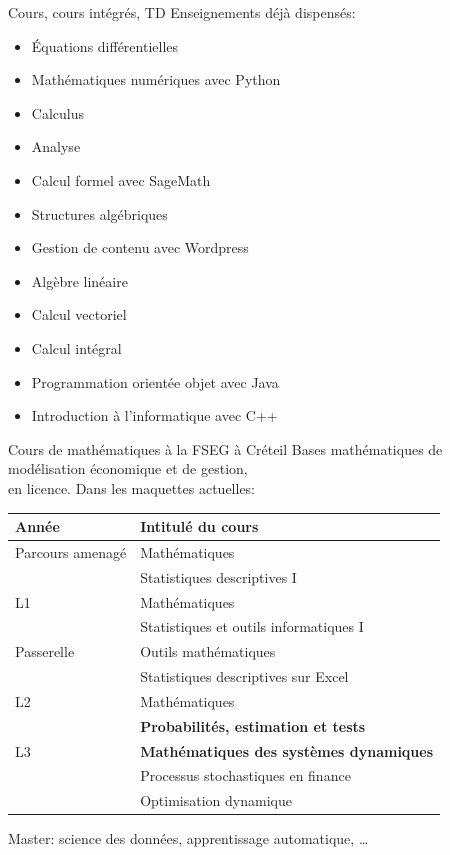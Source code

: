 \documentclass[
  french,
  ignorenonframetext,
]{beamer}
\providecommand{\tightlist}{%
  \setlength{\itemsep}{0pt}\setlength{\parskip}{0pt}}
\begin{document}
\begin{frame}{Cours, cours intégrés, TD}
\protect\hypertarget{cours-cours-intuxe9gruxe9s-td}{}
Enseignements déjà dispensés:

\begin{itemize}
\tightlist
\item
  Équations différentielles
\item
  Mathématiques numériques avec Python
\item
  Calculus
\item
  Analyse
\item
  Calcul formel avec SageMath
\item
  Structures algébriques
\item
  Gestion de contenu avec Wordpress
\item
  Algèbre linéaire
\item
  Calcul vectoriel
\item
  Calcul intégral
\item
  Programmation orientée objet avec Java
\item
  Introduction à l'informatique avec C++
\end{itemize}
\end{frame}

\begin{frame}{Cours de mathématiques à la FSEG à Créteil}
\protect\hypertarget{cours-de-mathuxe9matiques-uxe0-la-fseg-uxe0-cruxe9teil}{}
Bases mathématiques de modélisation économique et de gestion,\\
en licence. Dans les maquettes actuelles:

\begin{longtable}[]{@{}ll@{}}
\toprule
Année & Intitulé du cours\tabularnewline
\midrule
\endhead
Parcours amenagé & Mathématiques\tabularnewline
& Statistiques descriptives I\tabularnewline
L1 & Mathématiques\tabularnewline
& Statistiques et outils informatiques I\tabularnewline
Passerelle & Outils mathématiques\tabularnewline
& Statistiques descriptives sur Excel\tabularnewline
L2 & Mathématiques\tabularnewline
& \textbf{Probabilités, estimation et tests}\tabularnewline
L3 & \textbf{Mathématiques des systèmes dynamiques}\tabularnewline
& Processus stochastiques en finance\tabularnewline
& Optimisation dynamique\tabularnewline
\bottomrule
\end{longtable}

Master: science des données, apprentissage automatique, \ldots{}
\end{frame}
\end{document}
